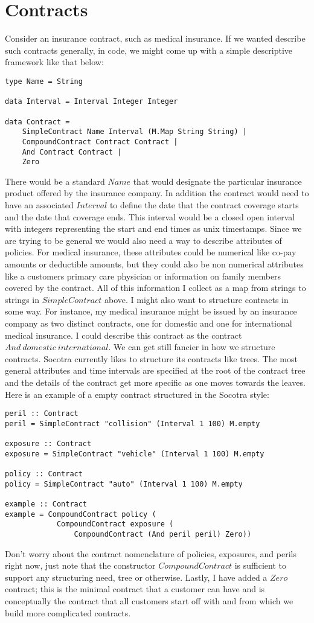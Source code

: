 \section{Contracts}
\label{sec:01:1}
Consider an insurance contract, such as medical insurance. If we wanted describe such contracts generally,
in code, we might come up with a simple descriptive framework like that below:
\begin{lstlisting}
type Name = String

data Interval = Interval Integer Integer

data Contract = 
    SimpleContract Name Interval (M.Map String String) |
    CompoundContract Contract Contract |
    And Contract Contract |
    Zero
\end{lstlisting}
There would be a standard $Name$ that would designate the particular insurance product offered by the insurance
company. In addition the contract would need to have an associated $Interval$ to define the
date that the contract coverage starts and the date that coverage ends. This interval would be a closed open interval
with integers representing the start and end times as unix timestamps. Since we are trying to be
general we would also need a way to describe attributes of policies. For medical insurance, these attributes could
be numerical like co-pay amounts or deductible amounts, but they could also be non numerical attributes like
a customers primary care physician or information on family members covered by the contract. All of this information
I collect as a map from strings to strings in $SimpleContract$ above. I might also want to structure contracts in some way. For
instance, my medical insurance might be issued by an insurance company as two distinct contracts, one for
domestic and one for international medical insurance. I could describe this contract as the contract
$ And \: domestic \: international $. We can get still fancier in how we structure contracts. Socotra currently likes to structure
its contracts like trees. The most general attributes and time intervals are specified at the root of the
contract tree and the details of the contract get more specific as one moves towards the leaves. Here is
an example of a empty contract structured in the Socotra style:
\begin{lstlisting}
peril :: Contract
peril = SimpleContract "collision" (Interval 1 100) M.empty

exposure :: Contract
exposure = SimpleContract "vehicle" (Interval 1 100) M.empty

policy :: Contract
policy = SimpleContract "auto" (Interval 1 100) M.empty

example :: Contract
example = CompoundContract policy (
            CompoundContract exposure (
                CompoundContract (And peril peril) Zero))
\end{lstlisting}
Don't worry about the contract nomenclature of policies, exposures, and perils right now, just note that the constructor $CompoundContract$
is sufficient to support any structuring need, tree or otherwise. Lastly, I have added a $Zero$ contract; this is the minimal contract that
a customer can have and is conceptually the contract that all customers start off with and from which we build more complicated
contracts.

